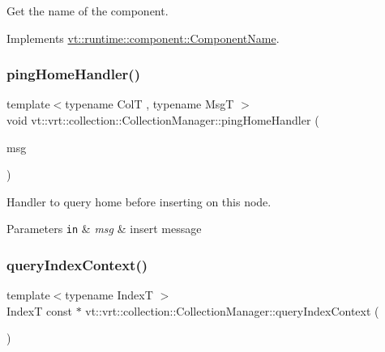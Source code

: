 Get the name of the component. 



Implements \hyperlink{structvt_1_1runtime_1_1component_1_1_component_name_a33c06229bb605a2b2ceff68830d6d773}{vt\+::runtime\+::component\+::\+Component\+Name}.

\mbox{\label{structvt_1_1vrt_1_1collection_1_1_collection_manager_af5d0c9d39e7d86dc7a2afb7b294e5fe1}} 
\subsubsection{\texorpdfstring{ping\+Home\+Handler()}{pingHomeHandler()}}
{\footnotesize\ttfamily template$<$typename ColT , typename MsgT $>$ \\
void vt\+::vrt\+::collection\+::\+Collection\+Manager\+::ping\+Home\+Handler (\begin{DoxyParamCaption}\item[{\hyperlink{structvt_1_1vrt_1_1collection_1_1_insert_msg}{Insert\+Msg}$<$ ColT, MsgT $>$ $\ast$}]{msg }\end{DoxyParamCaption})\hspace{0.3cm}{\ttfamily [static]}}



Handler to query home before inserting on this node. 


\begin{DoxyParams}[1]{Parameters}
\mbox{\tt in}  & {\em msg} & insert message \\
\hline
\end{DoxyParams}
\mbox{\label{structvt_1_1vrt_1_1collection_1_1_collection_manager_af192090e361f6239d6de2a3c80807421}} 
\subsubsection{\texorpdfstring{query\+Index\+Context()}{queryIndexContext()}}
{\footnotesize\ttfamily template$<$typename IndexT $>$ \\
IndexT const  $\ast$ vt\+::vrt\+::collection\+::\+Collection\+Manager\+::query\+Index\+Context (\begin{DoxyParamCaption}{ }\end{DoxyParamCaption})\hspace{0.3cm}{\ttfamily [static]}}



